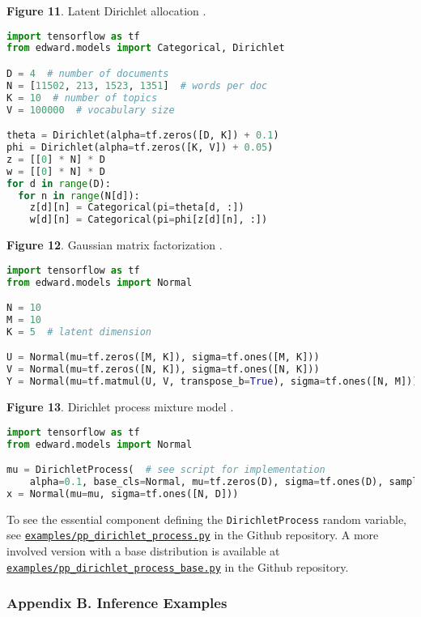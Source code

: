 \textbf{Figure 11}. Latent Dirichlet allocation \citep{blei2003latent}.
\begin{lstlisting}[language=python]
import tensorflow as tf
from edward.models import Categorical, Dirichlet

D = 4  # number of documents
N = [11502, 213, 1523, 1351]  # words per doc
K = 10  # number of topics
V = 100000  # vocabulary size

theta = Dirichlet(alpha=tf.zeros([D, K]) + 0.1)
phi = Dirichlet(alpha=tf.zeros([K, V]) + 0.05)
z = [[0] * N] * D
w = [[0] * N] * D
for d in range(D):
  for n in range(N[d]):
    z[d][n] = Categorical(pi=theta[d, :])
    w[d][n] = Categorical(pi=phi[z[d][n], :])
\end{lstlisting}

\textbf{Figure 12}. Gaussian matrix factorization
\citep{salakhutdinov2011probabilistic}.
\begin{lstlisting}[language=python]
import tensorflow as tf
from edward.models import Normal

N = 10
M = 10
K = 5  # latent dimension

U = Normal(mu=tf.zeros([M, K]), sigma=tf.ones([M, K]))
V = Normal(mu=tf.zeros([N, K]), sigma=tf.ones([N, K]))
Y = Normal(mu=tf.matmul(U, V, transpose_b=True), sigma=tf.ones([N, M]))
\end{lstlisting}

\textbf{Figure 13}. Dirichlet process mixture model \citep{antoniak1974mixtures}.
\begin{lstlisting}[language=python]
import tensorflow as tf
from edward.models import Normal

mu = DirichletProcess(  # see script for implementation
    alpha=0.1, base_cls=Normal, mu=tf.zeros(D), sigma=tf.ones(D), sample_n=N)
x = Normal(mu=mu, sigma=tf.ones([N, D]))
\end{lstlisting}
To see the essential component defining the \texttt{DirichletProcess}
random variable, see
\href{https://github.com/blei-lab/edward/blob/master/examples/pp_dirichlet_process.py}{\texttt{examples/pp_dirichlet_process.py}}
in the Github repository.
A more involved version with a base distribution is available at
\href{https://github.com/blei-lab/edward/blob/master/examples/pp_dirichlet_process_base.py}{\texttt{examples/pp_dirichlet_process_base.py}}
in the Github repository.

\subsubsection{Appendix B. Inference Examples}

